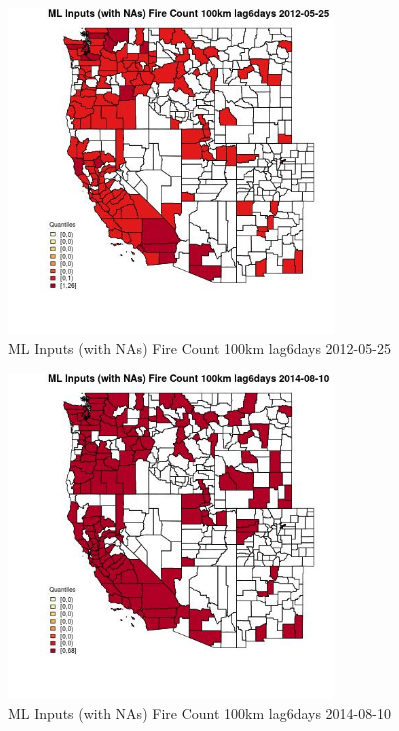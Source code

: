 \begin{figure} 
\centering  
\includegraphics[width=0.77\textwidth]{Code_Outputs/Report_ML_input_PM25_Step4_part_e_de_duplicated_aves_compiled_2019-05-18wNAs_CountyFire_Count_100km_lag6daysMean2012-05-25_2012-05-25.jpg} 
\caption{\label{fig:Report_ML_input_PM25_Step4_part_e_de_duplicated_aves_compiled_2019-05-18wNAsCountyFire_Count_100km_lag6daysMean2012-05-25_2012-05-25}ML Inputs (with NAs) Fire Count 100km lag6days 2012-05-25} 
\end{figure} 
 

\begin{figure} 
\centering  
\includegraphics[width=0.77\textwidth]{Code_Outputs/Report_ML_input_PM25_Step4_part_e_de_duplicated_aves_compiled_2019-05-18wNAs_CountyFire_Count_100km_lag6daysMean2014-08-10_2014-08-10.jpg} 
\caption{\label{fig:Report_ML_input_PM25_Step4_part_e_de_duplicated_aves_compiled_2019-05-18wNAsCountyFire_Count_100km_lag6daysMean2014-08-10_2014-08-10}ML Inputs (with NAs) Fire Count 100km lag6days 2014-08-10} 
\end{figure} 
 

